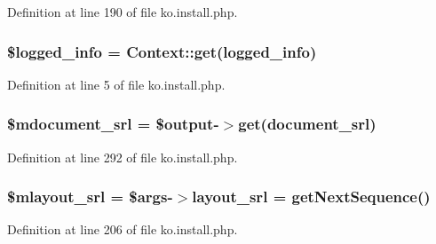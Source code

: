 Definition at line 190 of file ko.\+install.\+php.

\hypertarget{ko_8install_8php_a193c1593ceb216e9fb05b0bad01ebbc8}{}
\subsubsection[{\$logged\+\_\+info}]{\setlength{\rightskip}{0pt plus 5cm}\$logged\+\_\+info = {\bf Context\+::get}(\textquotesingle{}logged\+\_\+info\textquotesingle{})}\label{ko_8install_8php_a193c1593ceb216e9fb05b0bad01ebbc8}


Definition at line 5 of file ko.\+install.\+php.

\hypertarget{ko_8install_8php_a27c211d9a984964f84c8ffb6ea7328fc}{}
\subsubsection[{\$mdocument\+\_\+srl}]{\setlength{\rightskip}{0pt plus 5cm}\$mdocument\+\_\+srl = \$output-\/$>$get(\textquotesingle{}document\+\_\+srl\textquotesingle{})}\label{ko_8install_8php_a27c211d9a984964f84c8ffb6ea7328fc}


Definition at line 292 of file ko.\+install.\+php.

\hypertarget{ko_8install_8php_a576210f0eec2e42df2c40e04a3972bb0}{}
\subsubsection[{\$mlayout\+\_\+srl}]{\setlength{\rightskip}{0pt plus 5cm}\${\bf mlayout\+\_\+srl} = \$args-\/$>${\bf layout\+\_\+srl} = {\bf get\+Next\+Sequence}()}\label{ko_8install_8php_a576210f0eec2e42df2c40e04a3972bb0}


Definition at line 206 of file ko.\+install.\+php.

\hypertarget{ko_8install_8php_a5e701819149f6ea0893d4b79010417d3}{}
